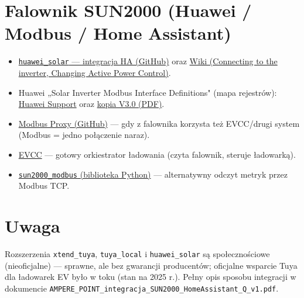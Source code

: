 \documentclass[11pt]{article}
\begin{document}
\section{Falownik SUN2000 (Huawei / Modbus / Home Assistant)}
\begin{itemize}
\item \href{https://github.com/wlcrs/huawei_solar}{\texttt{huawei\_solar} — integracja HA (GitHub)} oraz \href{https://github.com/wlcrs/huawei_solar/wiki}{Wiki (Connecting to the inverter, Changing Active Power Control)}.
\item Huawei „Solar Inverter Modbus Interface Definitions" (mapa rejestrów): \href{https://support.huawei.com/enterprise/en/doc/EDOC1100480329}{Huawei Support} oraz \href{https://community.symcon.de/uploads/short-url/pqZXWOienoBK2AsEzGD2oH1bcPR.pdf}{kopia V3.0 (PDF)}.
\item \href{https://github.com/Akulatraxas/ha-modbusproxy}{Modbus Proxy (GitHub)} — gdy z falownika korzysta też EVCC/drugi system (Modbus = jedno połączenie naraz).
\item \href{https://evcc.io/}{EVCC} — gotowy orkiestrator ładowania (czyta falownik, steruje ładowarką).
\item \href{https://github.com/olivergregorius/sun2000_modbus}{\texttt{sun2000\_modbus} (biblioteka Python)} — alternatywny odczyt metryk przez Modbus TCP.
\end{itemize}

\section{Uwaga}
Rozszerzenia \texttt{xtend\_tuya}, \texttt{tuya\_local} i \texttt{huawei\_solar} są społecznościowe (nieoficjalne) — sprawne, ale bez gwarancji producentów; oficjalne wsparcie Tuya dla ładowarek EV było w toku (stan na 2025 r.). Pełny opis sposobu integracji w dokumencie \texttt{AMPERE\_POINT\_integracja\_SUN2000\_HomeAssistant\_Q\_v1.pdf}.
\end{document}
